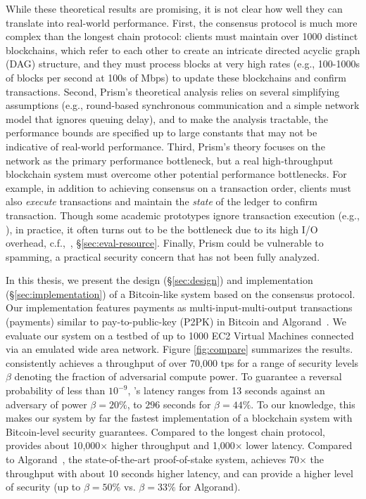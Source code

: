 While these theoretical results are promising, it is not clear how well they can translate into real-world performance. First, the \prism consensus protocol is much more complex than the longest chain protocol: clients must maintain over 1000 distinct blockchains, which refer to each other to create an intricate directed acyclic graph (DAG) structure, and they must process blocks at very high rates (e.g., 100-1000s of blocks per second at 100s of Mbps) to update these blockchains and confirm transactions. Second, Prism's theoretical analysis relies on several simplifying assumptions (e.g., round-based synchronous communication and a simple network model that ignores queuing delay), and to make the analysis tractable, the performance bounds are specified up to large constants that may not be indicative of real-world performance. Third, Prism's theory focuses on the network as the primary performance bottleneck, but a real high-throughput blockchain system must overcome other potential performance bottlenecks. For example, in addition to achieving consensus on a transaction order, clients must also {\em execute} transactions and maintain the {\em state} of the ledger to confirm transaction. Though some academic prototypes ignore transaction execution (e.g., \cite{ohiecode, conflux}),
in practice, it often turns out to be the bottleneck due to its high I/O overhead, c.f.,~\cite{raju2018mlsm},  \S\ref{sec:eval-resource}.
Finally, Prism could be vulnerable to spamming, a practical security concern that has not been fully analyzed. 






In this thesis, we present the design (\S\ref{sec:design}) and  implementation (\S\ref{sec:implementation}) of a Bitcoin-like system based on the \prism consensus protocol. Our implementation features payments as multi-input-multi-output transactions (payments) similar to pay-to-public-key (P2PK) in Bitcoin and Algorand~\cite{algorand, algorandcode}. We evaluate our system on a testbed of up to 1000 EC2 Virtual Machines connected via an emulated wide area network. Figure \ref{fig:compare} summarizes the results. \prism consistently achieves a throughput of over 70,000 tps for a range of security levels $\beta$ denoting the fraction of adversarial compute power.  To guarantee a reversal probability of less than $10^{-9}$, \prism's latency ranges from 13 seconds against an adversary of power $\beta = 20\%$, to $296$ seconds for $\beta = 44\%$. To our knowledge, this makes our system by far the fastest  implementation of a blockchain system with Bitcoin-level security guarantees. Compared to the longest chain protocol, \prism provides about 10,000$\times$ higher throughput and 1,000$\times$ lower latency. Compared to Algorand~\cite{algorand}, the state-of-the-art proof-of-stake system, \prism achieves 70$\times$ the throughput with about 10 seconds higher latency, and can provide a higher level of security  (up to $\beta = 50\%$ vs. $\beta=33\%$ for Algorand).

